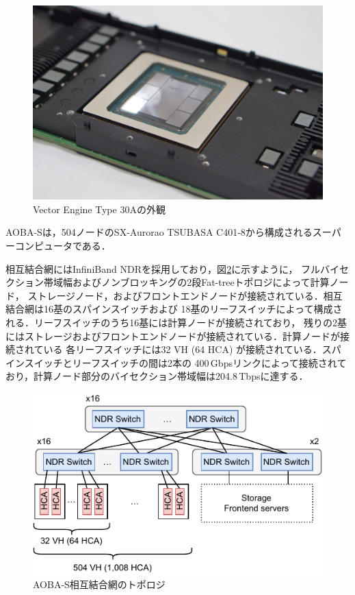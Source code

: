 ﻿\documentclass[submit,techrep,noauthor]{ipsj}
\begin{document}
\begin{figure}
  \centering
  \includegraphics[width=.9\columnwidth]{figs/ve30.jpg}
  \caption{Vector Engine Type 30Aの外観}\label{fig:ve-card}
\end{figure}

AOBA-Sは，504ノードのSX-Aurorao TSUBASA C401-8から構成されるスーパーコンピュータである．

相互結合網にはInfiniBand NDRを採用しており，図\ref{fig:topo}に示すように，
フルバイセクション帯域幅およびノンブロッキングの2段Fat-treeトポロジによって計算ノード，
ストレージノード，およびフロントエンドノードが接続されている．相互結合網は16基のスパインスイッチおよび
18基のリーフスイッチによって構成される．リーフスイッチのうち16基には計算ノードが接続されており，
残りの2基にはストレージおよびフロントエンドノードが接続されている．計算ノードが接続されている
各リーフスイッチには32 VH (64 HCA) が接続されている．スパインスイッチとリーフスイッチの間は2本の
400\,Gbpsリンクによって接続されており，計算ノード部分のバイセクション帯域幅は204.8\,Tbpsに達する．

\begin{figure}
  \centering
  \includegraphics{figs/nw_topology.pdf}
  \caption{AOBA-S相互結合網のトポロジ}\label{fig:topo}
\end{figure}
\end{document}
